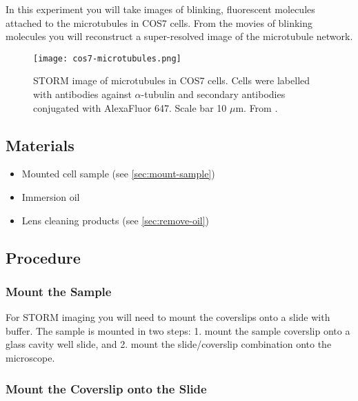 \documentclass[10pt,a4paper,oneside]{book}
\begin{document}
In this experiment you will take images of blinking, fluorescent molecules attached to the microtubules in COS7 cells. From the movies of blinking molecules you will reconstruct a super-resolved image of the microtubule network.

\begin{figure}[ht]
    \centering
    \texttt{[image: cos7-microtubules.png]}
    \caption{STORM image of microtubules in COS7 cells. Cells were labelled with antibodies against $\alpha$-tubulin and secondary antibodies conjugated with AlexaFluor 647. Scale bar 10 $\mu$m. From \cite{douglass-naturephotonics-2016}.}
    \label{fig:cos7-microtubules}
\end{figure}

\subsection{Materials}

\begin{itemize}
    \item{Mounted cell sample (see \autoref{sec:mount-sample})}
    \item{Immersion oil}
    \item{Lens cleaning products (see \autoref{sec:remove-oil})}
\end{itemize}

\subsection{Procedure}

\subsubsection{Mount the Sample}\label{sec:mount-sample}

For STORM imaging you will need to mount the coverslips onto a slide with buffer. The sample is mounted in two steps: 1. mount the sample coverslip onto a glass cavity well slide, and 2. mount the slide/coverslip combination onto the microscope.

\subsubsection{Mount the Coverslip onto the Slide}

\newline
\end{document}
